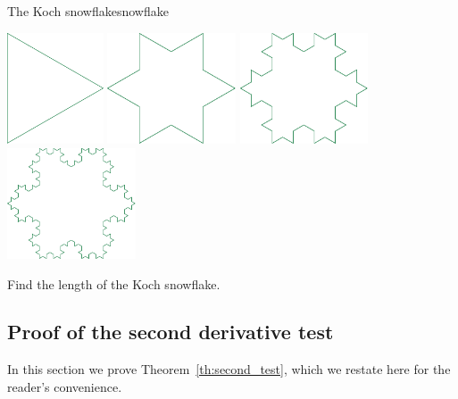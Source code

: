 \documentclass{watsonbook}
\begin{document}
\begin{exercise}{The Koch snowflake}{snowflake}
    \begin{center} 
      \includegraphics[width=2.85cm]{figures/koch0.pdf} \:
      \includegraphics[width=3.8cm]{figures/koch1.pdf} \:
      \includegraphics[width=3.8cm]{figures/koch2.pdf} \:
      \includegraphics[width=3.8cm]{figures/koch3.pdf}
    \end{center}
    
    Find the length of the Koch snowflake. 
  \end{exercise}

  \newpage
  
  \subsection{Proof of the second derivative test} \label{sec:proof_sdt}

  In this section we prove Theorem~\ref{th:second_test}, which we
  restate here for the reader's convenience.

  \begin{theo}{}{}
    \secondderivativetest
  \end{theo}
  
\end{document}
